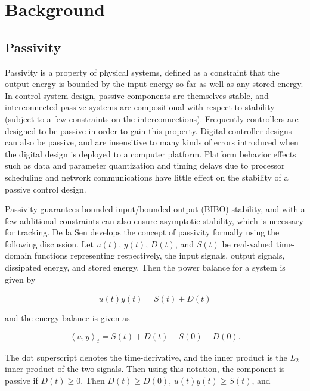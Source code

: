 \section{Background}
\label{section:background}

\subsection{Passivity}
 
Passivity is a property of physical systems, defined as a constraint that the output energy 
is bounded by the input energy so far as well as any stored energy.  In control system design,
passive components are themselves stable, and interconnected passive systems are compositional 
with respect to stability (subject to a few constraints on the interconnections).  Frequently 
controllers are designed to be passive in order to gain this property.  Digital controller 
designs can also be passive, and are insensitive to many kinds of errors introduced when the
digital design is deployed to a computer platform. Platform behavior effects such as data and 
parameter quantization \cite{pass:fettweis86} and timing delays due to processor scheduling and 
network communications \cite{ncs:chopra} \cite{ncs:kottenstette07} have little effect on the
stability of a passive control design.  

Passivity guarantees bounded-input/bounded-output (BIBO) stability, and with a few additional 
constraints can also ensure asymptotic stability, which is  necessary for tracking. De la Sen
\cite{pass:delasen2} develops the concept of passivity formally using the following discussion.  
Let $u(t)$, $y(t)$, $D(t)$, and $S(t)$ be real-valued time-domain functions representing 
respectively, the input signals, output signals, dissipated energy, and stored energy.  
Then the power balance for a system is given by 

\begin{equation}
 u(t)y(t) = \dot{S}(t) + \dot{D}(t)
\end{equation}

and the energy balance is given as

\begin{equation}
 \left \langle u,y \right \rangle_t = S(t) + D(t) - S(0) - D(0).
\end{equation}

The dot superscript denotes the time-derivative, and the inner product is
the $L_2$ inner product of the two signals.  Then using this notation, the component
is passive if $\dot{D}(t) \geq 0$.  Then $D(t) \geq D(0)$, $u(t)y(t) \geq \dot{S}(t)$, 
and 

